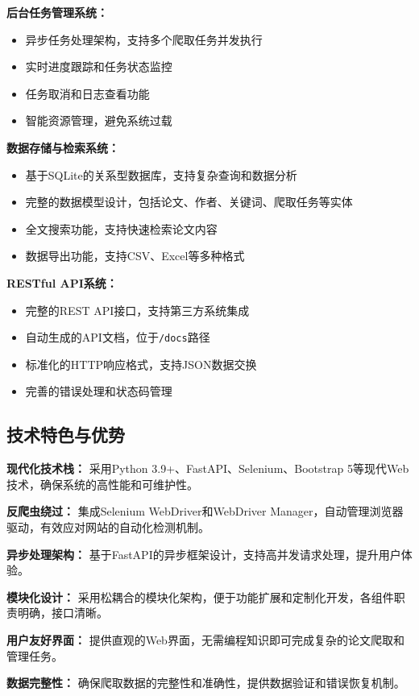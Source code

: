 \textbf{后台任务管理系统：}
\begin{itemize}
    \item 异步任务处理架构，支持多个爬取任务并发执行
    \item 实时进度跟踪和任务状态监控
    \item 任务取消和日志查看功能
    \item 智能资源管理，避免系统过载
\end{itemize}

\textbf{数据存储与检索系统：}
\begin{itemize}
    \item 基于SQLite的关系型数据库，支持复杂查询和数据分析
    \item 完整的数据模型设计，包括论文、作者、关键词、爬取任务等实体
    \item 全文搜索功能，支持快速检索论文内容
    \item 数据导出功能，支持CSV、Excel等多种格式
\end{itemize}

\textbf{RESTful API系统：}
\begin{itemize}
    \item 完整的REST API接口，支持第三方系统集成
    \item 自动生成的API文档，位于\lstinline|/docs|路径
    \item 标准化的HTTP响应格式，支持JSON数据交换
    \item 完善的错误处理和状态码管理
\end{itemize}

\subsection{技术特色与优势}
\label{ssec:technical_features}

\textbf{现代化技术栈：} 采用Python 3.9+、FastAPI、Selenium、Bootstrap 5等现代Web技术，确保系统的高性能和可维护性。

\textbf{反爬虫绕过：} 集成Selenium WebDriver和WebDriver Manager，自动管理浏览器驱动，有效应对网站的自动化检测机制。

\textbf{异步处理架构：} 基于FastAPI的异步框架设计，支持高并发请求处理，提升用户体验。

\textbf{模块化设计：} 采用松耦合的模块化架构，便于功能扩展和定制化开发，各组件职责明确，接口清晰。

\textbf{用户友好界面：} 提供直观的Web界面，无需编程知识即可完成复杂的论文爬取和管理任务。

\textbf{数据完整性：} 确保爬取数据的完整性和准确性，提供数据验证和错误恢复机制。

